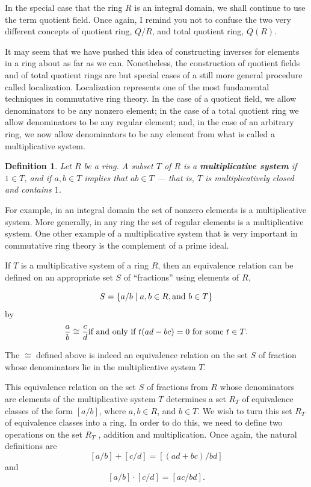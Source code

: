 \documentclass[12pt,reqno]{amsart}
\theoremstyle{plain}
\newtheorem{defi}{Definition}
\begin{document}
In the special case that the ring $R$ is an integral domain, we shall continue to use the term quotient field. Once again, I remind you not to confuse the two very different concepts of quotient ring, $Q/R$, and total quotient ring, $Q(R)$. 

It may seem that we have pushed this idea of constructing inverses for elements in a ring about as far as we can. Nonetheless, the construction of quotient fields and of total quotient rings are but special cases of a still more general procedure called localization. Localization represents one of the most fundamental techniques in commutative ring theory. In the case of a quotient field, we allow denominators to be any nonzero element; in the case of a total quotient ring we allow denominators to be any regular element; and, in the case of an arbitrary ring, we now allow denominators to be any element from what is called a multiplicative system.

\begin{defi} Let $R$ be a ring. A subset $T$ of $R$ is a \textbf{multiplicative system} if $1 \in T$, and if $a,b \in T$ implies that $ab \in T$ — that is, $T$ is multiplicatively closed and contains $1$.
\end{defi} 
For example, in an integral domain the set of nonzero elements is a multiplicative system. More generally, in any ring the set of regular elements is a multiplicative system. One other example of a multiplicative system that is very important in commutative ring theory is the complement of a prime ideal.

If $T$ is a multiplicative system of a ring $R$, then an equivalence relation can be defined on an appropriate set $S$ of ``fractions” using elements of $R$,

\[ S = \{ a/b \mid a, b \in R, \textup{and } b \in T \} 
\]
by 
\[
\frac{a}{b} \cong \frac{c}{d} \textup{if and only if $t(ad-bc) = 0$ for some $t \in T$.} 
\] 

The $\cong$ defined above is indeed an equivalence relation on the set $S$ of fraction whose denominators lie in the multiplicative system $T$.

This equivalence relation on the set $S$ of fractions from $R$ whose denominators are elements of the multiplicative system $T$ determines a set $R_T$ of equivalence classes of the form $[a/b]$, where $a, b \in R$, and $b \in T$. We wish to turn this set $R_T$ of equivalence classes into a ring. In order to do this, we need to define two operations on the set $R_T$ , addition and multiplication.
Once again, the natural definitions are
\[[a/b] + [c/d] = [(ad + bc)/bd]\]
and
\[ [a/b] \cdot [c/d] = [ac/bd]. \]
\end{document}
